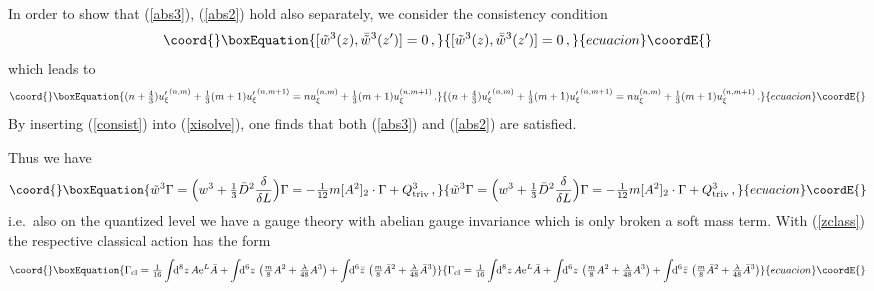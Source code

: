 \documentclass[a4paper,12pt]{article}
\providecommand{\e}{{\rm e}}
\providecommand{\dS}{\!\!{\rm d}^6z\,}
\providecommand{\dSb}{\!\!{\rm d}^6\bar z\,}
\providecommand{\dV}{\!\!{\rm d}^8z\,}
\providecommand{\Gcl}{\Gamma_{\rm cl}}
\providecommand{\uxi}{u_{\xi}}
\providecommand{\uxib}{{u_{\xi}'}}
\providecommand{\tfr}[2]{{\textstyle \frac{#1}{#2}}}
\providecommand{\fdq}[2]{\frac{\delta #1}{\delta #2}}
\begin{document}
In order to show that  (\ref{abs3}), (\ref{abs2}) hold also separately,
we consider the consistency condition 
\begin{equation}\coord{}\boxEquation{
[\tilde w^3(z), \bar{\tilde w}^3(z')]=0 \,,
}{
[\tilde w^3(z), \bar{\tilde w}^3(z')]=0 \,,
}{ecuacion}\coordE{}\end{equation}
which leads to
\begin{equation}\coord{}\boxEquation{
(n+\tfr{4}{3}) \uxib^{(n,m)} +\tfr{1}{3} (m+1) \uxib^{(n,m+1)} = n
\uxi^{(n,m)} +\tfr{1}{3} (m+1) \uxi^{(n,m+1)} \,.
 \label{consist}
}{
(n+\tfr{4}{3}) \uxib^{(n,m)} +\tfr{1}{3} (m+1) \uxib^{(n,m+1)} = n
\uxi^{(n,m)} +\tfr{1}{3} (m+1) \uxi^{(n,m+1)} \,.
 }{ecuacion}\coordE{}\end{equation}
By inserting (\ref{consist}) into (\ref{xisolve}), one finds that both
(\ref{abs3}) and (\ref{abs2}) are satisfied.

Thus we have
\begin{equation}\coord{}\boxEquation{
\tilde w^3 \Gamma = \Bigl( w^3 +\tfr{1}{3} \bar D^2 \fdq{}{L} \Bigr) \Gamma
=-\tfr{1}{12} m [A^2]_2\cdot
\Gamma + Q^3_{\rm triv}\,, \label{gaugeinv} 
}{
\tilde w^3 \Gamma = \Bigl( w^3 +\tfr{1}{3} \bar D^2 \fdq{}{L} \Bigr) \Gamma
=-\tfr{1}{12} m [A^2]_2\cdot
\Gamma + Q^3_{\rm triv}\,, }{ecuacion}\coordE{}\end{equation}
i.e.\ also on the quantized level we have a gauge theory with abelian gauge
invariance which is only broken a soft mass term.
With (\ref{zclass}) the respective classical action has
the form
\begin{equation}\coord{}\boxEquation{
\Gcl = \tfr{1}{16} \int \dV A \e^{L} \bar A 
+ \int \dS \left(\tfr{m}{8} A^2 +
  \tfr{\lambda}{48} A^3 \right) 
 + \int \dSb \left(\tfr{m}{8} \bar A^2 +   \tfr{\lambda}{48} \bar A^3 \right)
}{
\Gcl = \tfr{1}{16} \int \dV A \e^{L} \bar A 
+ \int \dS \left(\tfr{m}{8} A^2 +
  \tfr{\lambda}{48} A^3 \right) 
 + \int \dSb \left(\tfr{m}{8} \bar A^2 +   \tfr{\lambda}{48} \bar A^3 \right)
}{ecuacion}\coordE{}\end{equation}
\end{document}

